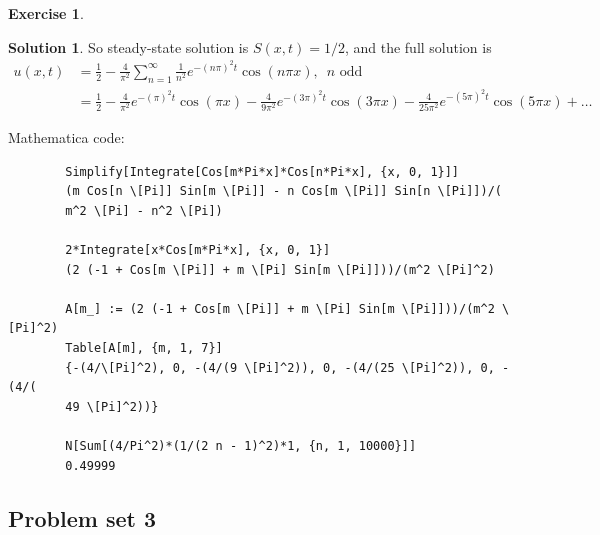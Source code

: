 \documentclass{article}
\theoremstyle{definition}
\newtheorem*{exer*}{Exercise}
\newtheorem*{sln*}{Solution}
\begin{document}
\begin{exer*}
\begin{sln*}
		So steady-state solution is $S(x,t) = 1/2$, and the full solution is
		\begin{align*}
		u(x,t) &= \frac{1}{2}-\frac{4}{\pi^2}\sum_{n=1}^\infty \frac{1}{n^2}e^{-(n\pi)^2 t}\cos(n\pi x),\,\,\, n \text{ odd}\\
		&= \frac{1}{2}-\frac{4}{\pi ^2}e^{-(\pi)^2 t}\cos(\pi x)    -\frac{4}{9 \pi ^2}e^{-(3\pi)^2 t}\cos(3\pi x)        -\frac{4}{25 \pi ^2}e^{-(5\pi)^2 t}\cos(5\pi x) + \dots
		\end{align*}
		
		\noindent Mathematica code:
		\begin{lstlisting}
		Simplify[Integrate[Cos[m*Pi*x]*Cos[n*Pi*x], {x, 0, 1}]]
		(m Cos[n \[Pi]] Sin[m \[Pi]] - n Cos[m \[Pi]] Sin[n \[Pi]])/(
		m^2 \[Pi] - n^2 \[Pi])
		
		2*Integrate[x*Cos[m*Pi*x], {x, 0, 1}]
		(2 (-1 + Cos[m \[Pi]] + m \[Pi] Sin[m \[Pi]]))/(m^2 \[Pi]^2)
		
		A[m_] := (2 (-1 + Cos[m \[Pi]] + m \[Pi] Sin[m \[Pi]]))/(m^2 \[Pi]^2)
		Table[A[m], {m, 1, 7}]
		{-(4/\[Pi]^2), 0, -(4/(9 \[Pi]^2)), 0, -(4/(25 \[Pi]^2)), 0, -(4/(
		49 \[Pi]^2))}
		
		N[Sum[(4/Pi^2)*(1/(2 n - 1)^2)*1, {n, 1, 10000}]]
		0.49999
		\end{lstlisting}
	\end{sln*}
\end{exer*}


\newpage
\subsection{Problem set 3} 
\end{document}
